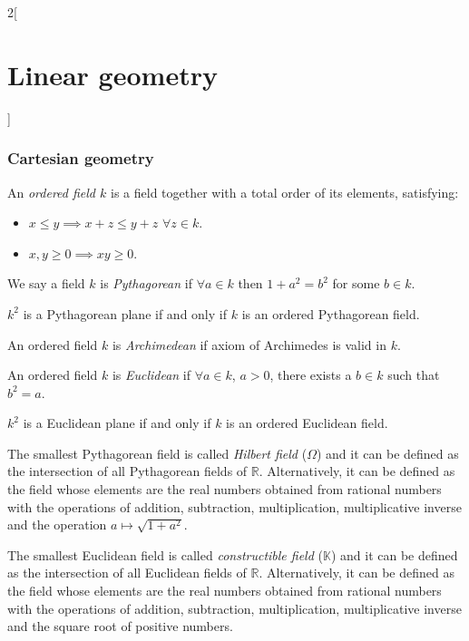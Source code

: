 \documentclass[class=article,10pt,crop=false]{standalone}
\begin{document}
\begin{multicols}{2}[\section{Linear geometry}]
\subsubsection*{Cartesian geometry}
\begin{definition}
An \textit{ordered field $k$} is a field together with a total order of its elements, satisfying:
\begin{itemize}
    \item $x\leq y\implies x+z\leq y+z$ $\forall z\in k$.
    \item $x,y\geq 0\implies xy\geq 0$.
\end{itemize}
\end{definition}
\begin{definition}
We say a field $k$ is \textit{Pythagorean} if $\forall a\in k$ then $1+a^2=b^2$ for some $b\in k$.
\end{definition}
\begin{theorem}
$k^2$ is a Pythagorean plane if and only if $k$ is an ordered Pythagorean field.
\end{theorem}
\begin{definition}
An ordered field $k$ is \textit{Archimedean} if axiom of Archimedes is valid in $k$.
\end{definition}
\begin{definition}
An ordered field $k$ is \textit{Euclidean} if $\forall a\in k$, $a>0$, there exists a $b\in k$ such that $b^2=a$.
\end{definition}
\begin{theorem}
$k^2$ is a Euclidean plane if and only if $k$ is an ordered Euclidean field.
\end{theorem}
\begin{definition}
The smallest Pythagorean field is called \textit{Hilbert field} ($\Omega$) and it can be defined as the intersection of all Pythagorean fields of $\mathbb{R}$. Alternatively, it can be defined as the field whose elements are the real numbers obtained from rational numbers with the operations of addition, subtraction, multiplication, multiplicative inverse and the operation $a\mapsto\sqrt{1+a^2}$.
\end{definition}
\begin{definition}
The smallest Euclidean field is called \textit{constructible field} ($\mathbb{K}$) and it can be defined as the intersection of all Euclidean fields of $\mathbb{R}$. Alternatively, it can be defined as the field whose elements are the real numbers obtained from rational numbers with the operations of addition, subtraction, multiplication, multiplicative inverse and the square root of positive numbers.
\end{definition}

\end{multicols}
\end{document}
